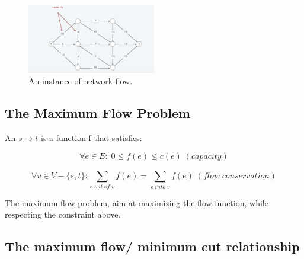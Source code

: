\documentclass[11pt]{article}
\begin{document}
\begin{figure}[H]
		\centering
		\includegraphics[width=0.5\textwidth ]{network1}
		\caption{An instance of network flow.}
\end{figure}

\subsection{The Maximum Flow Problem}
An $s \rightarrow t$ is a function f that satisfies:

\[ \forall e \in E: \; 0 \leq f(e) \leq c(e) \; (capacity)\] 

\[ \forall v \in V - \{s, t\}: \sum_{e \; out \; of \; v}^{} f(e) = \sum_{e \; into \; v}^{} f(e) \; (flow \; conservation)\]

The maximum flow problem, aim at maximizing the flow function, while respecting the constraint above.

\subsection{The maximum flow/ minimum cut relationship}
\end{document}
